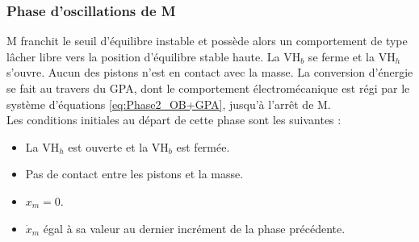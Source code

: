 	\subsubsection{Phase d'oscillations de M}
	\label{subsubsec:2.5.2.c:Phase d'oscillations de M}
M franchit le seuil d'équilibre instable et possède alors un comportement de type lâcher libre vers la position d'équilibre stable haute. La VH$_b$ se ferme et la VH$_h$ s'ouvre. Aucun des pistons n'est en contact avec la masse. La conversion d'énergie se fait au travers du GPA, dont le comportement électromécanique est régi par le système d'équations \ref{eq:Phase2_OB+GPA}, jusqu'à l'arrêt de M.\\
Les conditions initiales au départ de cette phase sont les suivantes : 
\begin{itemize}[label=$\bullet$]
	\item La VH$_h$ est ouverte et la VH$_b$ est fermée.
 	\item Pas de contact entre les pistons et la masse.
	\item $x_m=0$.
 	\item $\dot{x}_m$ égal à sa valeur au dernier incrément de la phase précédente.
\end{itemize}

